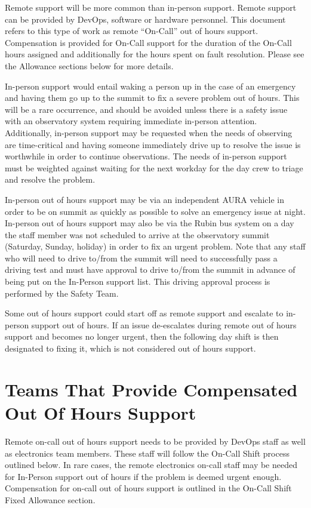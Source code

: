 Remote support will be more common than in-person support.  Remote support can be provided by DevOps, software or hardware personnel.  This document refers to this type of work as remote ``On-Call'' out of hours support. Compensation is provided for On-Call support for the duration of the On-Call hours assigned and additionally for the hours spent on fault resolution.  Please see the Allowance sections below for more details.

In-person support would entail waking a person up in the case of an emergency and having them go up to the summit to fix a severe problem out of hours. 
This will be a rare occurrence, and should be avoided unless there is a safety issue with an observatory system requiring immediate in-person attention.
Additionally, in-person support may be requested when the needs of observing are time-critical and having someone immediately drive up to resolve the issue is worthwhile in order to continue observations.  
The needs of in-person support must be weighted against waiting for the next workday for the day crew to triage and resolve the problem.

In-person out of hours support may be via an independent AURA vehicle in order to be on summit as quickly as possible to solve an emergency issue at night.  In-person out of hours support may also be via the Rubin bus system on a day the staff member was not scheduled to arrive at the observatory summit (Saturday, Sunday, holiday) in order to fix an urgent problem.  Note that any staff who will need to drive to/from the summit will need to successfully pass a driving test and must have approval to drive to/from the summit in advance of being put on the In-Person support list.  This driving approval process is performed by the Safety Team.

Some out of hours support could start off as remote support and escalate to in-person support out of hours.  If an issue de-escalates during remote out of hours support and becomes no longer urgent, then the following day shift is then designated to fixing it, which is not considered out of hours support.

\section{Teams That Provide Compensated Out Of Hours Support}

Remote on-call out of hours support needs to be provided by DevOps staff as well as electronics team members.  These staff will follow the On-Call Shift process outlined below.  In rare cases, the remote electronics on-call staff may be needed for In-Person support out of hours if the problem is deemed urgent enough.  Compensation for on-call out of hours support is outlined in the On-Call Shift Fixed Allowance section.

